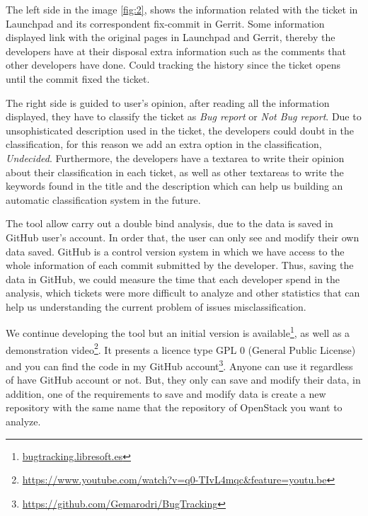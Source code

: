 \documentclass[ifip]{svmult}
\begin{document}
The left side in the image \ref{fig:2}, shows the information related with the ticket in Launchpad and its correspondent fix-commit in Gerrit. Some information displayed link with the original pages in Launchpad and Gerrit, thereby the  developers have at their disposal extra information such as the comments that other developers have done. Could tracking the history since the ticket opens until the commit fixed the ticket.

The right side is guided to user's opinion, after reading all the information displayed, they have to classify the ticket as \textit{Bug report} or \textit{Not Bug report}. Due to unsophisticated description used in the ticket, the developers could doubt in the classification, for this reason we add an extra option in the classification, \textit{Undecided}. Furthermore, the developers have a textarea to write their opinion about their classification in each ticket, as well as other textareas to write the keywords found in the title and the description which can help us building an automatic classification system in the future.

The tool allow carry out a double bind analysis, due to the data is saved in GitHub user's account. In order that, the user can only see and modify their own data saved. GitHub is a control version system in which we have access to the whole information of each commit submitted by the developer. Thus, saving the data in GitHub, we could measure the time that each developer spend in the analysis, which tickets were more difficult to analyze and other statistics that can help us understanding the current problem of issues misclassification.

We continue developing the tool but an initial version is available\footnote{\url{bugtracking.libresoft.es}}, as well as a demonstration video\footnote{\url{https://www.youtube.com/watch?v=q0-TIvL4mqc&feature=youtu.be}}. It presents a licence type GPL 0 (General Public License) and you can find the code in my GitHub account\footnote{\url{https://github.com/Gemarodri/BugTracking}}. Anyone can use it regardless of have GitHub account or not. But, they only can save and modify their data, in addition, one of the requirements to save and modify data is create a new repository with the same name that the repository of OpenStack you want to analyze.
\end{document}
